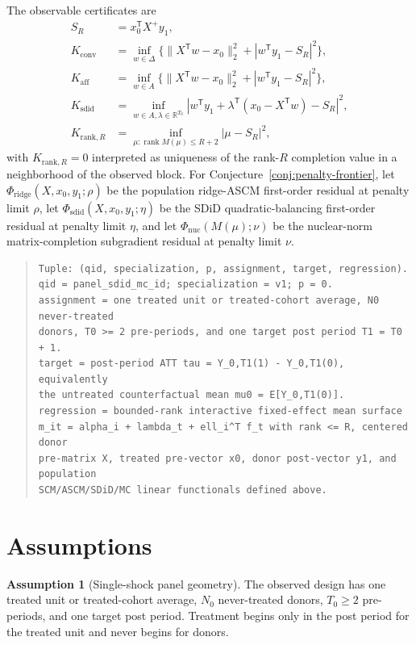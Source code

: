 \documentclass[11pt]{article}
\newcommand{\transpose}{\mathsf{T}}
\newcommand{\R}{\mathbb{R}}
\theoremstyle{definition}
\newtheorem{assumption}{Assumption}
\theoremstyle{plain}
\theoremstyle{remark}
\begin{document}
The observable certificates are
\[
\begin{aligned}
S_R&=x_0^{\transpose}X^{+}y_1,\\
K_{\mathrm{conv}}&=\inf_{w\in\Delta}
  \{\|X^{\transpose}w-x_0\|_2^2+|w^{\transpose}y_1-S_R|^2\},\\
K_{\mathrm{aff}}&=\inf_{w\in A}
  \{\|X^{\transpose}w-x_0\|_2^2+|w^{\transpose}y_1-S_R|^2\},\\
K_{\mathrm{sdid}}&=\inf_{w\in A,\lambda\in\R^{T_0}}
  |w^{\transpose}y_1+\lambda^{\transpose}(x_0-X^{\transpose}w)-S_R|^2,\\
K_{\mathrm{rank},R}&=\inf_{\mu:\operatorname{rank}M(\mu)\le R+2}
  |\mu-S_R|^2,
\end{aligned}
\]
with $K_{\mathrm{rank},R}=0$ interpreted as uniqueness of the rank-$R$
completion value in a neighborhood of the observed block. For
Conjecture~\ref{conj:penalty-frontier}, let
$\Phi_{\mathrm{ridge}}(X,x_0,y_1;\rho)$ be the population ridge-ASCM
first-order residual at penalty limit $\rho$, let
$\Phi_{\mathrm{sdid}}(X,x_0,y_1;\eta)$ be the SDiD quadratic-balancing
first-order residual at penalty limit $\eta$, and let
$\Phi_{\mathrm{nuc}}(M(\mu);\nu)$ be the nuclear-norm matrix-completion
subgradient residual at penalty limit $\nu$.

\begin{quote}
\begin{verbatim}
Tuple: (qid, specialization, p, assignment, target, regression).
qid = panel_sdid_mc_id; specialization = v1; p = 0.
assignment = one treated unit or treated-cohort average, N0 never-treated
donors, T0 >= 2 pre-periods, and one target post period T1 = T0 + 1.
target = post-period ATT tau = Y_0,T1(1) - Y_0,T1(0), equivalently
the untreated counterfactual mean mu0 = E[Y_0,T1(0)].
regression = bounded-rank interactive fixed-effect mean surface
m_it = alpha_i + lambda_t + ell_i^T f_t with rank <= R, centered donor
pre-matrix X, treated pre-vector x0, donor post-vector y1, and population
SCM/ASCM/SDiD/MC linear functionals defined above.
\end{verbatim}
\end{quote}

\section{Assumptions}
\begin{assumption}[Single-shock panel geometry]\label{ass:single-shock}
The observed design has one treated unit or treated-cohort average, $N_0$
never-treated donors, $T_0\ge 2$ pre-periods, and one target post period.
Treatment begins only in the post period for the treated unit and never begins
for donors.
\end{assumption}
\end{document}
